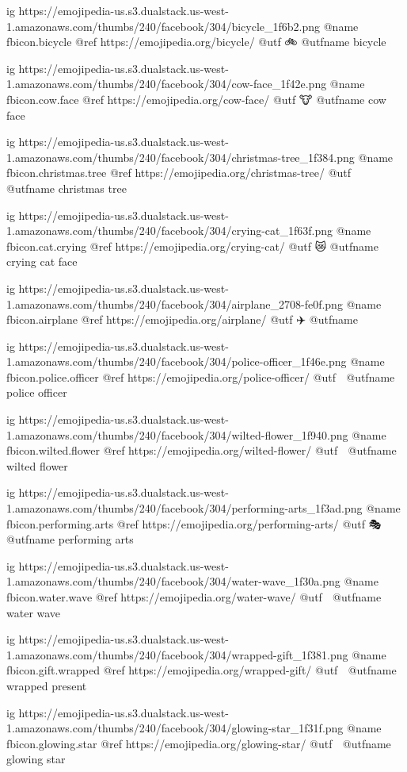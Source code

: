   ig https://emojipedia-us.s3.dualstack.us-west-1.amazonaws.com/thumbs/240/facebook/304/bicycle_1f6b2.png
  @name fbicon.bicycle
  @ref https://emojipedia.org/bicycle/
  @utf 🚲
  @utfname bicycle

  ig https://emojipedia-us.s3.dualstack.us-west-1.amazonaws.com/thumbs/240/facebook/304/cow-face_1f42e.png
  @name fbicon.cow.face
  @ref https://emojipedia.org/cow-face/
  @utf 🐮
  @utfname cow face

  ig https://emojipedia-us.s3.dualstack.us-west-1.amazonaws.com/thumbs/240/facebook/304/christmas-tree_1f384.png
  @name fbicon.christmas.tree
  @ref https://emojipedia.org/christmas-tree/
  @utf 🎄
  @utfname christmas tree

  ig https://emojipedia-us.s3.dualstack.us-west-1.amazonaws.com/thumbs/240/facebook/304/crying-cat_1f63f.png
  @name fbicon.cat.crying
  @ref https://emojipedia.org/crying-cat/
  @utf 😿
  @utfname crying cat face

  ig https://emojipedia-us.s3.dualstack.us-west-1.amazonaws.com/thumbs/240/facebook/304/airplane_2708-fe0f.png
  @name fbicon.airplane
  @ref https://emojipedia.org/airplane/
  @utf ✈️
  @utfname

  ig https://emojipedia-us.s3.dualstack.us-west-1.amazonaws.com/thumbs/240/facebook/304/police-officer_1f46e.png
  @name fbicon.police.officer
  @ref https://emojipedia.org/police-officer/
  @utf 👮
  @utfname police officer

  ig https://emojipedia-us.s3.dualstack.us-west-1.amazonaws.com/thumbs/240/facebook/304/wilted-flower_1f940.png
  @name fbicon.wilted.flower
  @ref https://emojipedia.org/wilted-flower/
  @utf 🥀
  @utfname wilted flower

  ig https://emojipedia-us.s3.dualstack.us-west-1.amazonaws.com/thumbs/240/facebook/304/performing-arts_1f3ad.png
  @name fbicon.performing.arts
  @ref https://emojipedia.org/performing-arts/
  @utf 🎭
  @utfname performing arts

  ig https://emojipedia-us.s3.dualstack.us-west-1.amazonaws.com/thumbs/240/facebook/304/water-wave_1f30a.png
  @name fbicon.water.wave
  @ref https://emojipedia.org/water-wave/
  @utf 🌊
  @utfname water wave

  ig https://emojipedia-us.s3.dualstack.us-west-1.amazonaws.com/thumbs/240/facebook/304/wrapped-gift_1f381.png
  @name fbicon.gift.wrapped
  @ref https://emojipedia.org/wrapped-gift/
  @utf 🎁
  @utfname wrapped present

  ig https://emojipedia-us.s3.dualstack.us-west-1.amazonaws.com/thumbs/240/facebook/304/glowing-star_1f31f.png
  @name fbicon.glowing.star
  @ref https://emojipedia.org/glowing-star/
  @utf 🌟
  @utfname glowing star

